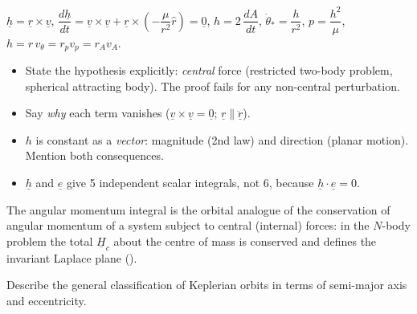 \begin{keyf}
$\underline h=\underline r\times\underline v$, \quad $\dfrac{d\underline h}{dt}=\underline v\times\underline v+\underline r\times\left(-\dfrac{\mu}{r^2}\hat r\right)=\underline 0$,
\quad $h=2\,\dfrac{dA}{dt}$, \quad $\dot\theta_*=\dfrac{h}{r^2}$, \quad $p=\dfrac{h^2}{\mu}$, \quad $h=r\,v_\theta=r_pv_p=r_Av_A$.
\end{keyf}

\pitfalls
\begin{itemize}
\item State the hypothesis explicitly: \emph{central} force (restricted two-body problem, spherical attracting body).
The proof fails for any non-central perturbation.
\item Say \emph{why} each term vanishes ($\underline v\times\underline v=\underline 0$; $\underline r\parallel\ddot{\underline r}$).
\item $h$ is constant as a \emph{vector}: magnitude (2nd law) and direction (planar motion). Mention both consequences.
\item $\underline h$ and $\underline e$ give 5 independent scalar integrals, not 6, because $\underline h\cdot\underline e=0$.
\end{itemize}

\further
The angular momentum integral is the orbital analogue of the conservation of angular momentum of a system subject to
central (internal) forces: in the $N$-body problem the total $\underline H_c$ about the centre of mass is conserved and
defines the invariant Laplace plane ().


\begin{qbox}
Describe the general classification of Keplerian orbits in terms of semi-major axis and eccentricity.
\end{qbox}

